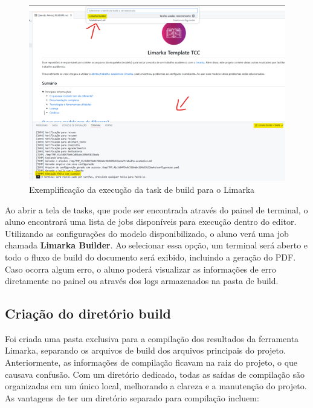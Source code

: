 \documentclass[
	12pt,				%
	oneside,			%
	a4paper,			%
	english,			%
	french,				%
	spanish,			%
	brazil				%
	]{abntex2}
\begin{document}
\begin{figure}[htbp]
\hypertarget{limarka_builder_task}{%
\caption{Exemplificação da execução da task de build para o Limarka}\label{limarka_builder_task}
\begin{center}
\includegraphics[scale=0.6]{imagens/screenshot/limarka-builder-task.png}
\end{center}
}
\end{figure}

Ao abrir a tela de tasks, que pode ser encontrada através do painel de
terminal, o aluno encontrará uma lista de jobs disponíveis para execução
dentro do editor. Utilizando as configurações do modelo disponibilizado,
o aluno verá uma job chamada \textbf{Limarka Builder}. Ao selecionar
essa opção, um terminal será aberto e todo o fluxo de build do documento
será exibido, incluindo a geração do PDF. Caso ocorra algum erro, o
aluno poderá visualizar as informações de erro diretamente no painel ou
através dos logs armazenados na pasta de build.

\hypertarget{criauxe7uxe3o-do-diretuxf3rio-build}{%
\subsection{Criação do diretório
build}\label{criauxe7uxe3o-do-diretuxf3rio-build}}

Foi criada uma pasta exclusiva para a compilação dos resultados da
ferramenta Limarka, separando os arquivos de build dos arquivos
principais do projeto. Anteriormente, as informações de compilação
ficavam na raiz do projeto, o que causava confusão. Com um diretório
dedicado, todas as saídas de compilação são organizadas em um único
local, melhorando a clareza e a manutenção do projeto. As vantagens de
ter um diretório separado para compilação incluem:
\end{document}
